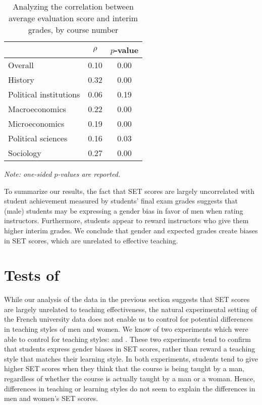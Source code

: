 \documentclass[12pt]{article}
\begin{document}
\begin{table}[htbp]
  \centering
  \footnotesize 
  \caption{Analyzing the correlation between average evaluation score and interim grades, by course number}
    \begin{tabular}{lcc}
    \toprule 
                          & $\rho$  & $p$-value  \\
   \midrule
    Overall &                 0.10       & 0.00   \\
    History &                 0.32       & 0.00   \\
    Political institutions &  0.06       & 0.19     \\
    Macroeconomics &          0.22       & 0.00    \\
    Microeconomics &          0.19       & 0.00     \\
    Political sciences &      0.16       & 0.03     \\
    Sociology &               0.27       & 0.00     \\
    \bottomrule
    \end{tabular}%
 \label{tab:instructor gender}%
  
  \textit{Note: one-sided $p$-values are reported.}
\end{table}%
\normalsize




To summarize our results, the fact that SET scores are largely uncorrelated with student achievement measured by students' final exam grades suggests that (male) students may be expressing a gender bias in favor of men when rating instructors. Furthermore, students appear to reward instructors who give them higher interim grades. We conclude that gender and expected grades create biases in SET scores, which are unrelated to effective teaching. 

\section{Tests of \citet{MacNell2014}}

While our analysis of the data in the previous section suggests that SET scores are largely unrelated to teaching effectiveness, the natural experimental setting of the French university data does not enable us to control for potential differences in teaching styles of men and women. We know of two experiments which were able to control for teaching styles: \citet{Arbuckle2003} and \citet{MacNell2014}. These two experiments tend to confirm that students express gender biases in SET scores, rather than reward a teaching style that matches their learning style. In both experiments, students tend to give higher SET scores when they think that the course is being taught by a man, regardless of whether the course is actually taught by a man or a woman. Hence, differences in teaching or learning styles do not seem to explain the differences in men and women's SET scores.
\end{document}
